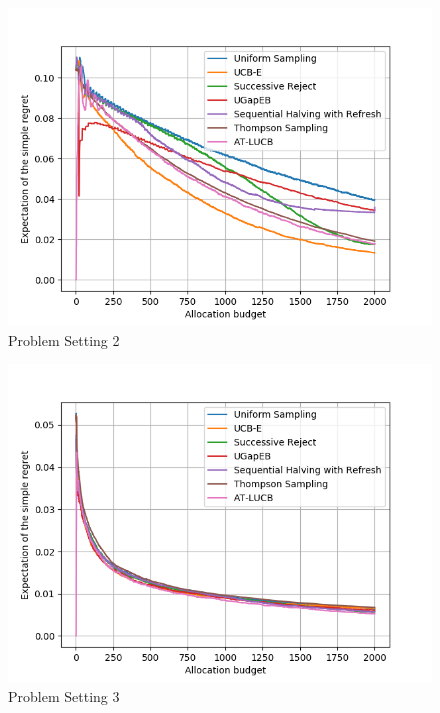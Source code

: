 \documentclass[runningheads,a4paper]{llncs}
\begin{document}
\begin{figure}[ht]
   	\centering\includegraphics[width=\textwidth]{../results/ts_mpa/setting2.png}
   	 \caption{Problem Setting 2}
	\label{ts_mpa_2}
\end{figure}
\begin{figure}[ht]
    	\centering\includegraphics[width=\textwidth]{../results/ts_mpa/setting3.png}
    	\caption{Problem Setting 3}
	\label{ts_mpa_3}
\end{figure}
\end{document}

